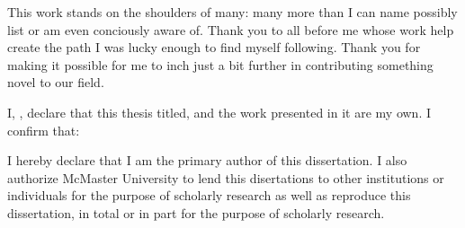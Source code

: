 \documentclass[
11pt, %
oneside, %
english, %
singlespacing, %
]{macthesis} %
\def\blankpage{%
      \clearpage%
      \thispagestyle{empty}%
      \addtocounter{page}{-1}%
      \null%
      \clearpage}
\begin{document}
\begin{acknowledgements}
    This work stands on the shoulders of many: many more than I can name possibly list or am even conciously aware of. Thank you to all before me whose work help create the path I was lucky enough to find myself following. Thank you for making it possible for me to inch just a bit further in contributing something novel to our field.
  \end{acknowledgements}
\blankpage
\clearpage


\tableofcontents %

\listoffigures %

\listoftables %



\begin{declaration}
\addchaptertocentry{\authorshipname}

\noindent I, \authorname, declare that this thesis titled, \emph{\ttitle} and the work presented in it are my own. I confirm that:

I hereby declare that I am the primary author of this dissertation. I also authorize McMaster University to lend this disertations to other institutions or individuals for the purpose of scholarly research as well as reproduce this dissertation, in total or in part for the purpose of scholarly research.

\end{declaration}
\end{document}
